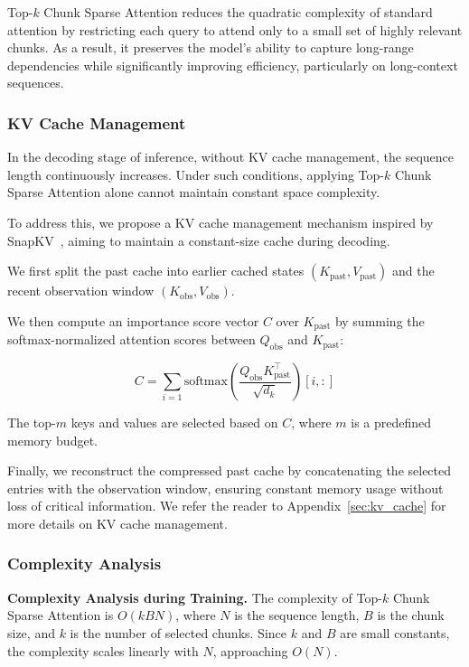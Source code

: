 Top-\(k\) Chunk Sparse Attention reduces the quadratic complexity of standard attention by restricting each query to attend only to a small set of highly relevant chunks. As a result, it preserves the model’s ability to capture long-range dependencies while significantly improving efficiency, particularly on long-context sequences.

\subsubsection{KV Cache Management}
In the decoding stage of inference, without KV cache management, the sequence length continuously increases. 
Under such conditions, applying Top-\(k\) Chunk Sparse Attention alone cannot maintain constant space complexity. 

To address this, we propose a KV cache management mechanism inspired by SnapKV~\cite{li2024snapkvllmknowslooking}, aiming to maintain a constant-size cache during decoding. 

We first split the past cache into earlier cached states \((K_{\text{past}}, V_{\text{past}})\) and the recent observation window \((K_{\text{obs}}, V_{\text{obs}})\).

We then compute an importance score vector \(C\) over \(K_{\text{past}}\) by summing the softmax-normalized attention scores between \(Q_{\text{obs}}\) and \(K_{\text{past}}\):

\begin{equation}
C = \sum_{i=1} \text{softmax}\left( \frac{Q_{\text{obs}} K_{\text{past}}^\top}{\sqrt{d_k}} \right)[i, :]
\label{eq:importance_score_short}
\end{equation}

The top-\(m\) keys and values are selected based on \(C\), where \(m\) is a predefined memory budget.

Finally, we reconstruct the compressed past cache by concatenating the selected entries with the observation window, ensuring constant memory usage without loss of critical information. 
We refer the reader to Appendix~\ref{sec:kv_cache} for more details on KV cache management.


\subsubsection{Complexity Analysis}
\textbf{Complexity Analysis during Training.}
The complexity of Top-$k$ Chunk Sparse Attention is \( O(kBN) \), where \(N\) is the sequence length, \(B\) is the chunk size, and \(k\) is the number of selected chunks. 
Since \(k\) and \(B\) are small constants, the complexity scales linearly with \(N\), approaching \(O(N)\).

